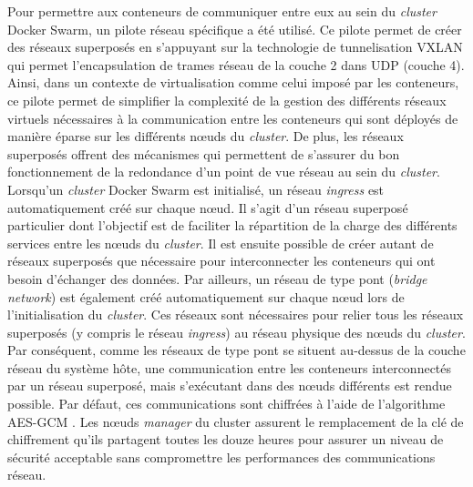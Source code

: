 Pour permettre aux conteneurs de communiquer entre eux au sein du \textit{cluster} Docker Swarm, un pilote réseau spécifique a été utilisé. Ce pilote permet de créer des réseaux superposés en s'appuyant sur la technologie de tunnelisation \ac{VXLAN} \citep{rfc7348} qui permet l'encapsulation de trames réseau de la couche 2 dans \acs{UDP} (couche 4). Ainsi, dans un contexte de virtualisation comme celui imposé par les conteneurs, ce pilote permet de simplifier la complexité de la gestion des différents réseaux virtuels nécessaires à la communication entre les conteneurs qui sont déployés de manière éparse sur les différents n\oe{}uds du \textit{cluster}. De plus, les réseaux superposés offrent des mécanismes qui permettent de s'assurer du bon fonctionnement de la redondance d'un point de vue réseau au sein du \textit{cluster}. Lorsqu'un \textit{cluster} Docker Swarm est initialisé, un réseau \textit{ingress} est automatiquement créé sur chaque n\oe{}ud. Il s'agit d'un réseau superposé particulier dont l'objectif est de faciliter la répartition de la charge des différents services entre les n\oe{}uds du \textit{cluster}. Il est ensuite possible de créer autant de réseaux superposés que nécessaire pour interconnecter les conteneurs qui ont besoin d'échanger des données. Par ailleurs, un réseau de type pont (\textit{bridge network}) est également créé automatiquement sur chaque n\oe{}ud lors de l'initialisation du \textit{cluster}. Ces réseaux sont nécessaires pour relier tous les réseaux superposés (y compris le réseau \textit{ingress}) au réseau physique des n\oe{}uds du \textit{cluster}. Par conséquent, comme les réseaux de type pont se situent au-dessus de la couche réseau du système hôte, une communication entre les conteneurs interconnectés par un réseau superposé, mais s'exécutant dans des n\oe{}uds différents est rendue possible. Par défaut, ces communications sont chiffrées à l'aide de l'algorithme AES-GCM \citep{rfc5288}. Les n\oe{}uds \textit{manager} du cluster assurent le remplacement de la clé de chiffrement qu'ils partagent toutes les douze heures pour assurer un niveau de sécurité acceptable sans compromettre les performances des communications réseau.

